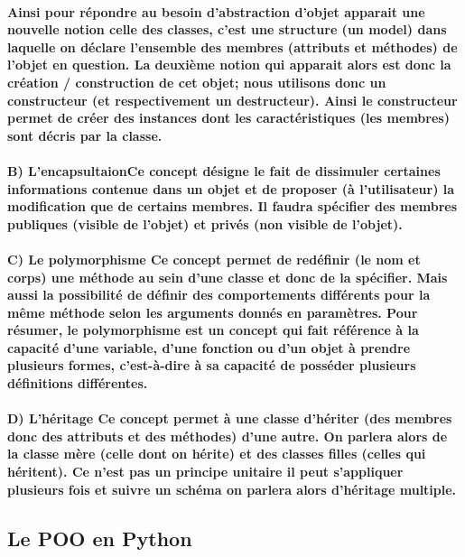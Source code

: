 \documentclass[a4paper, 12pt, twoside]{article}
\begin{document}
\paragraph{Ainsi pour répondre au besoin d'abstraction d'objet apparait une nouvelle notion celle des classes, c'est une structure (un model)
dans laquelle on déclare l'ensemble des membres (attributs et méthodes) de l'objet en question. La deuxième notion qui apparait alors est donc la création / construction de cet objet; nous utilisons donc un constructeur (et respectivement un destructeur). Ainsi le constructeur permet de créer des instances dont les caractéristiques (les membres) sont décris par la classe.}

\paragraph{B) L'encapsultaion\newline Ce concept désigne le fait de dissimuler certaines informations contenue dans un objet et de proposer (à l'utilisateur) la modification
que de certains membres. Il faudra spécifier des membres publiques (visible de l'objet) et privés (non visible de l'objet).}

\paragraph{C) Le polymorphisme \newline
Ce concept permet de redéfinir (le nom et corps) une méthode au sein d'une classe et donc de la spécifier. Mais aussi la possibilité de 
définir des comportements différents pour la même méthode selon les arguments donnés en paramètres. Pour résumer, le polymorphisme est un concept qui fait 
référence à la capacité d’une variable, d’une fonction ou d’un objet à prendre plusieurs formes, c’est-à-dire à sa capacité de posséder
plusieurs définitions différentes.}

\paragraph{D) L'héritage
Ce concept permet à une classe d'hériter (des membres donc des attributs et des méthodes) d'une autre. On parlera alors de la classe mère (celle dont on hérite) et des classes filles (celles qui héritent). Ce n'est pas un principe unitaire il peut s'appliquer plusieurs fois et suivre un schéma on parlera alors d'héritage multiple. }

\subsection{Le POO en Python}
\end{document}
